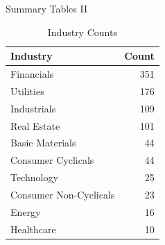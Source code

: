 \documentclass[
	8pt, %
]{beamer}
\begin{document}
\begin{frame}{Summary Tables II}
 \begin{table}[h]
\centering
\begin{tabular}{lr}
\hline
Industry & Count \\
\hline
Financials & 351 \\
Utilities & 176 \\
Industrials & 109 \\
Real Estate & 101 \\
Basic Materials & 44 \\
Consumer Cyclicals & 44 \\
Technology & 25 \\
Consumer Non-Cyclicals & 23 \\
Energy & 16 \\
Healthcare & 10 \\
\hline
\end{tabular}
\caption{Industry Counts}
\label{table:3}
\end{table}
 
\end{frame}
\end{document}
